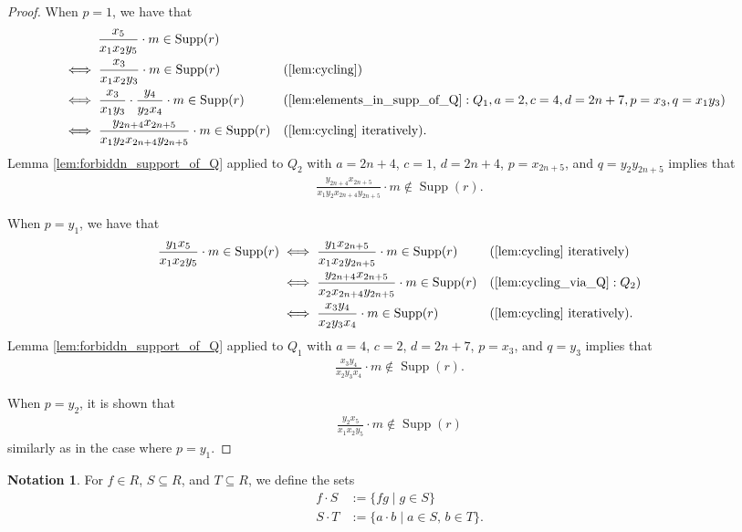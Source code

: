 \documentclass[12pt,a4paper]{amsart}
\theoremstyle{plain}
\theoremstyle{definition}
\newtheorem{nota}[thrm]{Notation}
\def\bnota{\begin{nota}}
\def\enota{\end{nota}}
\def\bproof{\begin{proof}}
\def\eproof{\end{proof}}
\theoremstyle{remark}
\DeclareMathOperator{\Supp}{Supp}
\renewcommand{\subset}{\subseteq}
\begin{document}
\bproof 
When $p = 1$, we have that
\begin{align*}
    &\phantom{\iff\,\,\,} \frac{x_{5}}{x_{1}x_{2}y_{5}}\cdot m \in \Supp(r)\\
    &\iff \frac{x_{3}}{x_{1}x_{2}y_{3}}\cdot m \in \Supp(r) & & (\ref{lem:cycling}) \\
    &\iff \frac{x_{3}}{x_{1}y_{3}} \cdot \frac{y_{4}}{y_{2}x_{4}}\cdot m \in \Supp(r) & & (\ref{lem:elements_in_supp_of_Q} : Q_{1}, a = 2, c = 4, d = 2n+7, p = x_{3}, q = x_{1}y_{3}) \\
    &\iff \frac{y_{2n+4}x_{2n+5}}{x_{1}y_{2}x_{2n+4}y_{2n+5}} \cdot m \in \Supp(r) & & (\ref{lem:cycling} \text{ iteratively}).
\end{align*}
Lemma \ref{lem:forbiddn_support_of_Q} applied to $Q_{2}$ with $a= 2n+4$, $c = 1$, $d = 2n+4$, $p = x_{2n+5}$, and $q = y_{2}y_{2n+5}$ implies that 
\begin{align*}
    \frac{y_{2n+4}x_{2n+5}}{x_{1}y_{2}x_{2n+4}y_{2n+5}} \cdot m \notin \Supp(r).
\end{align*}

When $p = y_{1}$, we have that
\begin{align*}
     \frac{y_{1}x_{5}}{x_{1}x_{2}y_{5}}\cdot m \in \Supp(r)
    &\iff \frac{y_{1}x_{2n+5}}{x_{1}x_{2}y_{2n+5}}\cdot m \in \Supp(r) & & (\ref{lem:cycling} \text{ iteratively}) \\
    &\iff \frac{y_{2n+4}x_{2n+5}}{x_{2}x_{2n+4}y_{2n+5}}\cdot m \in \Supp(r) & & (\ref{lem:cycling_via_Q} : Q_{2}) \\
    &\iff \frac{x_{3}y_{4}}{x_{2}y_{3}x_{4}}\cdot m \in \Supp(r) & & (\ref{lem:cycling} \text{ iteratively}).
\end{align*}
Lemma  \ref{lem:forbiddn_support_of_Q} applied to $Q_{1}$ with $a= 4$, $c = 2$, $d = 2n+7$, $p = x_{3}$, and $q = y_{3}$ implies that 
\begin{align*}
    \frac{x_{3}y_{4}}{x_{2}y_{3}x_{4}}\cdot m \notin \Supp(r).
\end{align*}

When $p = y_{2}$, it is shown that 
\begin{align*}
    \frac{y_{2}x_{5}}{x_{1}x_{2}y_{5}}\cdot m \notin \Supp(r)
\end{align*}
similarly as in the case where $p = y_{1}$.
\eproof

\bnota
For $f \in R$, $S \subset R$, and $T \subset R$, we define the sets
\begin{align*}
    f \cdot S &:= \{f g \mid g \in S \} \\
    S \cdot T &:= \{ a \cdot b \mid a \in S, \, b \in T \}.
\end{align*}
\enota
\end{document}
